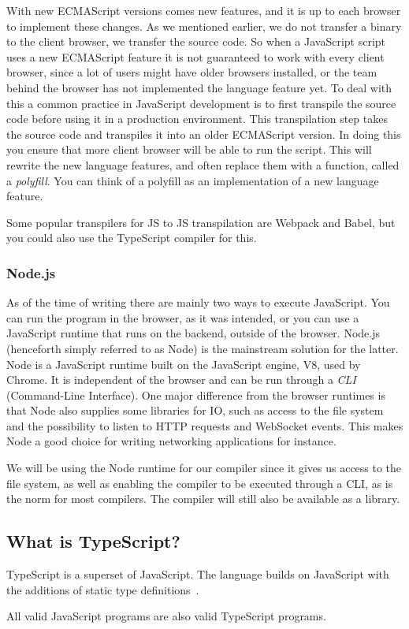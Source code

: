 With new ECMAScript versions comes new features, and it is up to each browser to implement these changes.
As we mentioned earlier, we do not transfer a binary to the client browser, we transfer the source code.
So when a JavaScript script uses a new ECMAScript feature it is not guaranteed to work with every client browser, since a lot of users might have older browsers installed, or the team behind the browser has not implemented the language feature yet.
To deal with this a common practice in JavaScript development is to first transpile the source code before using it in a production environment.
This transpilation step takes the source code and transpiles it into an older ECMAScript version.
In doing this you ensure that more client browser will be able to run the script.
This will rewrite the new language features, and often replace them with a function, called a \textit{polyfill}.
You can think of a polyfill as an implementation of a new language feature.

Some popular transpilers for JS to JS transpilation are Webpack and Babel, but you could also use the TypeScript compiler for this.

\subsubsection{Node.js}\label{subsubsec:node}

As of the time of writing there are mainly two ways to execute JavaScript.
You can run the program in the browser, as it was intended, or you can use a JavaScript runtime that runs on the backend, outside of the browser.
Node.js (henceforth simply referred to as Node) is the mainstream solution for the latter.
Node is a JavaScript runtime built on the JavaScript engine, V8, used by Chrome.
It is independent of the browser and can be run through a \textit{CLI} (Command-Line Interface).
One major difference from the browser runtimes is that Node also supplies some libraries for IO, such as access to the file system and the possibility to listen to HTTP requests and WebSocket events.
This makes Node a good choice for writing networking applications for instance.

We will be using the Node runtime for our compiler since it gives us access to the file system, as well as enabling the compiler to be executed through a CLI, as is the norm for most compilers.
The compiler will still also be available as a library.

\subsection{What is TypeScript?}\label{subsec:what-is-typescript}

TypeScript is a superset of JavaScript.
The language builds on JavaScript with the additions of static type definitions~\cite{tswebsite}.

All valid JavaScript programs are also valid TypeScript programs.
